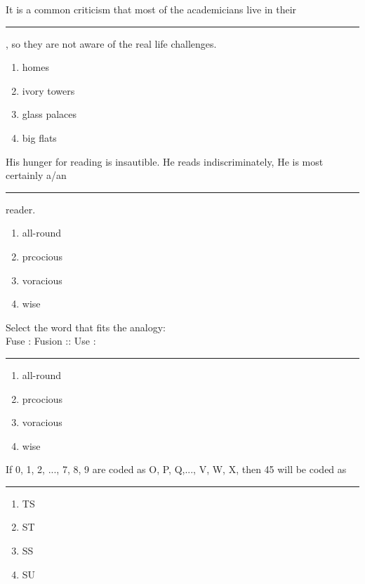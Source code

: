 \iffalse
  \title{GateAssignment7}
  \author{EE24BTECH11048-NITHIN.K}
  \section{ce}
  \chapter{2020} 
\fi

\item It is a common criticism that most of the academicians live in their \rule{1cm}{0.4pt}, so they are not aware of the real life challenges.
	\begin{enumerate}
		\item homes
		\item ivory towers
		\item glass palaces
		\item big flats
	\end{enumerate}
\item His hunger for reading is insautible. He reads indiscriminately, He is most certainly a/an \rule{1cm}{0.4pt} reader.
	\begin{enumerate}
                \item all-round
                \item prcocious
                \item voracious
                \item wise
        \end{enumerate}
\item Select the word that fits the analogy: \\
	Fuse : Fusion :: Use : \rule{1cm}{0.4pt}
	\begin{enumerate}
                \item all-round
                \item prcocious
                \item voracious
                \item wise
        \end{enumerate}
\item If 0, 1, 2, ..., 7, 8, 9 are coded as O, P, Q,..., V, W, X, then 45 will be coded as \rule{1cm}{0.4pt}
	\begin{enumerate}         
                \item TS
                \item ST
                \item SS
                \item SU
        \end{enumerate}
